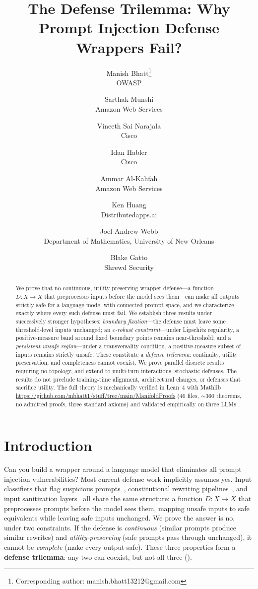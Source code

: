 \documentclass[11pt]{article}
\title{The Defense Trilemma: Why Prompt Injection Defense Wrappers Fail?}
\author{
    {\rm Manish Bhatt\thanks{Corresponding author: manish.bhatt13212@gmail.com}}\hspace{0.5em}\footnotemark[2]\\
    OWASP
    \and
    {\rm Sarthak Munshi}\footnotemark[2]\\
    Amazon Web Services
  \and
  {\rm Vineeth Sai Narajala}\footnotemark[2]\\
  Cisco
  \and
  {\rm Idan Habler}\footnotemark[2]\\
  Cisco
  \and
  {\rm Ammar Al-Kahfah}\footnotemark[2]\\
  Amazon Web Services
  \and
  {\rm Ken Huang}\\
  Distributedapps.ai
  \and
  {\rm Joel Andrew Webb}\\
  Department of Mathematics, University of New Orleans
  \and
  {\rm Blake Gatto}\\
  Shrewd Security
  }
\date{}
\begin{document}
\maketitle
\renewcommand{\thefootnote}{\fnsymbol{footnote}}
\begin{abstract}
We prove that no continuous, utility-preserving wrapper defense---a
function $D\colon X\to X$ that preprocesses inputs before the model
sees them---can make all outputs strictly safe for a language model
with connected prompt space, and we characterize exactly where every
such defense must fail. We establish three results under
successively stronger hypotheses: \emph{boundary fixation}---the defense must leave some
threshold-level inputs unchanged; an \emph{$\varepsilon$-robust
constraint}---under Lipschitz regularity, a positive-measure band
around fixed boundary points remains near-threshold; and a
\emph{persistent unsafe region}---under a transversality condition, a
positive-measure subset of inputs remains strictly unsafe. These
constitute a \emph{defense trilemma}: continuity, utility preservation,
and completeness cannot coexist. We prove parallel discrete results
requiring no topology, and extend to multi-turn interactions,
stochastic defenses. The results do not
preclude training-time alignment, architectural changes, or defenses
that sacrifice utility. The full theory is mechanically verified in
Lean~4 with Mathlib
\url{https://github.com/mbhatt1/stuff/tree/main/ManifoldProofs}
(46 files, ${\sim}360$ theorems, no admitted proofs, three standard
axioms) and validated empirically on three LLMs~\cite{munshi2026manifold}.
\end{abstract}


\section{Introduction}
\label{sec:intro}

Can you build a wrapper around a language model that eliminates all
prompt injection vulnerabilities? Most current defense work implicitly
assumes yes. Input classifiers that flag suspicious
prompts~\cite{alon2023detecting}, constitutional rewriting
pipelines~\cite{bai2022constitutional}, and input sanitization
layers~\cite{inan2023llama} all share the same structure: a
function $D\colon X \to X$ that preprocesses prompts before the model
sees them, mapping unsafe inputs to safe equivalents while leaving safe
inputs unchanged. We prove the answer is no, under two constraints. If the defense
is \emph{continuous} (similar prompts produce similar rewrites) and
\emph{utility-preserving} (safe prompts pass through unchanged), it
cannot be \emph{complete} (make every output safe). These three
properties form a \textbf{defense trilemma}: any two can coexist, but
not all three ().
\end{document}
